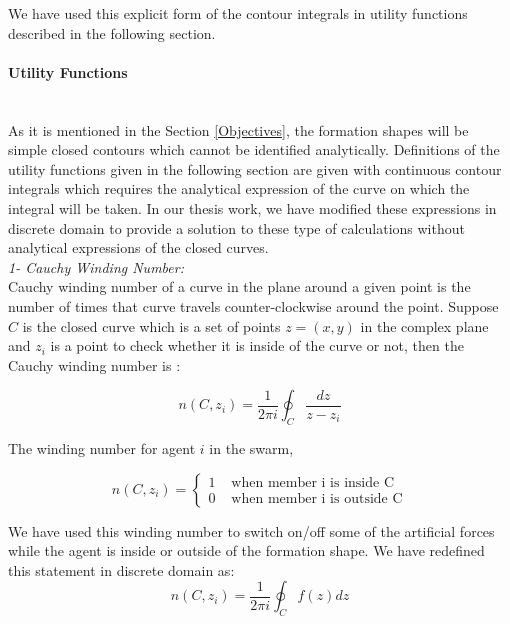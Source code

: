 We have used this explicit form of the contour integrals in utility functions described in the following section. 		
		
\paragraph{Utility Functions}\hspace{0pt} \\
As it is mentioned in the Section \ref{Objectives}, the formation shapes will be simple closed contours which cannot be identified analytically. Definitions of the utility functions given in the following section are given with continuous contour integrals which requires the analytical expression of the curve on which the integral will be taken. In our thesis work, we have modified these expressions in discrete domain to provide a solution to  these type of calculations without analytical expressions of the closed curves.\\

\textit{ 		1- Cauchy Winding Number:} \\ 
Cauchy winding number of a curve in the plane around a given point is the number of times that curve travels counter-clockwise around the point. Suppose $C$ is the closed curve which is a set of points $z=(x,y)$ in the complex plane  and $z_i$ is a point to check whether it is inside of the curve or not, then the Cauchy winding number is \cite{17} :
					
\begin{equation}
 n(C,z_i) = \frac{1}{2\pi i}\oint_C \frac{dz}{z-z_i}
\end{equation}
		
The winding number for agent $i$ in the swarm,

\begin{equation}
n(C,z_i) = \left\{ \begin{array}{rl}
1 &\mbox{ when member i is inside C} \\
0 &\mbox{ when member i is outside C}
\end{array} \right.
\end{equation}

We have used this winding number to switch on/off some of the artificial forces while the agent is inside or outside of the formation shape. We have redefined this statement in discrete domain as:
\begin{equation}
n(C,z_i) = \frac{1}{2\pi i} \oint_C f(z)dz
\end{equation}

